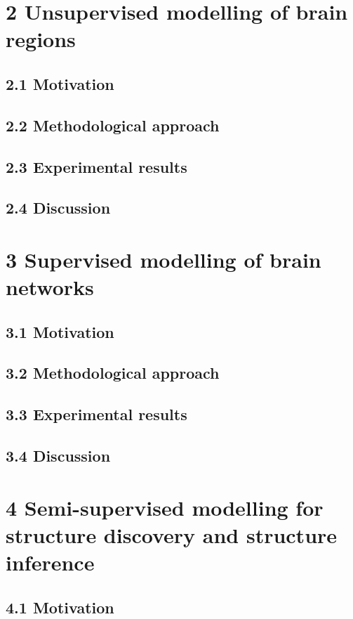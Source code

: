 \documentclass[authoryear,review,3p]{elsarticle}
\begin{document}
\section*{2 Unsupervised modelling of brain regions}

\subsection*{2.1 Motivation}
\subsection*{2.2 Methodological approach}
\subsection*{2.3 Experimental results}
\subsection*{2.4 Discussion}



\section*{3 Supervised modelling of brain networks}

\subsection*{3.1 Motivation}
\subsection*{3.2 Methodological approach}
\subsection*{3.3 Experimental results}
\subsection*{3.4 Discussion}


\section*{4 Semi-supervised modelling for structure discovery
and structure inference}

\subsection*{4.1 Motivation}
\end{document}
